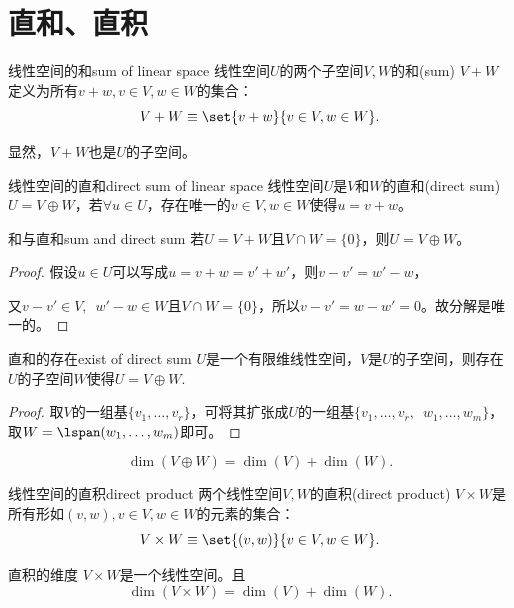 \section{直和、直积}
\begin{definition}{线性空间的和}{sum of linear space}
	线性空间$U$的两个子空间$V,W$的和(sum) $V+W$定义为所有$v+w,v\in V,w\in W$的集合：
	\begin{equation}
		V+W\equiv\set{v+w}{v\in V,w\in W}.
	\end{equation}
\end{definition}
显然，$V+W$也是$U$的子空间。
\begin{definition}{线性空间的直和}{direct sum of linear space}
	线性空间$U$是$V$和$W$的直和(direct sum) $U=V\oplus W$，若$\forall u\in U$，存在唯一的$v\in V,w\in W$使得$u=v+w$。
\end{definition}
\begin{theorem}{和与直和}{sum and direct sum}
	若$U=V+W$且$V\cap W=\{0\}$，则$U=V\oplus W$。
\end{theorem}
\begin{proof}
	假设$u\in U$可以写成$u=v+w=v'+w'$，则$v-v'=w'-w$，
	
	又$v-v'\in V,\enspace w'-w\in W$且$V\cap W=\{0\}$，所以$v-v'=w-w'=0$。故分解是唯一的。
\end{proof}
\begin{theorem}{直和的存在}{exist of direct sum}
	$U$是一个有限维线性空间，$V$是$U$的子空间，则存在$U$的子空间$W$使得$U=V\oplus W.$
\end{theorem}
\begin{proof}
	取$V$的一组基$\{v_1,\ldots,v_r\}$，可将其扩张成$U$的一组基$\{v_1,\ldots,v_r,$\ $w_1,\ldots,w_m\}$，取$W=\lspan(w_1,\ldots,w_m)$即可。
\end{proof}
\begin{corollary}
	\begin{equation}
		\dim(V\oplus W)=\dim(V)+\dim(W).
	\end{equation}
\end{corollary}
\begin{definition}{线性空间的直积}{direct product}
	两个线性空间$V,W$的直积(direct product) $V\times W$是所有形如$(v,w),v\in V,w\in W$的元素的集合：
	\begin{equation}
		V\times W\equiv\set{(v,w)}{v\in V,w\in W}.
	\end{equation}
\end{definition}
\begin{theorem}{直积的维度}{}
	$V\times W$是一个线性空间。且
	\begin{equation}
		\dim(V\times W)=\dim(V)+\dim(W).
	\end{equation}
\end{theorem}

